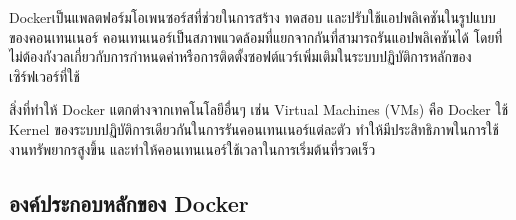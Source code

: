 \hspace{1.27cm}Docker\cite{Docker}เป็นแพลตฟอร์มโอเพนซอร์สที่ช่วยในการสร้าง ทดสอบ และปรับใช้แอปพลิเคชันในรูปแบบของคอนเทนเนอร์ คอนเทนเนอร์เป็นสภาพแวดล้อมที่แยกจากกันที่สามารถรันแอปพลิเคชันได้ โดยที่ไม่ต้องกังวลเกี่ยวกับการกำหนดค่าหรือการติดตั้งซอฟต์แวร์เพิ่มเติมในระบบปฏิบัติการหลักของเซิร์ฟเวอร์ที่ใช้

\hspace{0.8cm}สิ่งที่ทำให้ Docker แตกต่างจากเทคโนโลยีอื่นๆ เช่น Virtual Machines (VMs) คือ Docker ใช้ Kernel ของระบบปฏิบัติการเดียวกันในการรันคอนเทนเนอร์แต่ละตัว ทำให้มีประสิทธิภาพในการใช้งานทรัพยากรสูงขึ้น และทำให้คอนเทนเนอร์ใช้เวลาในการเริ่มต้นที่รวดเร็ว

\subsection{องค์ประกอบหลักของ Docker}
